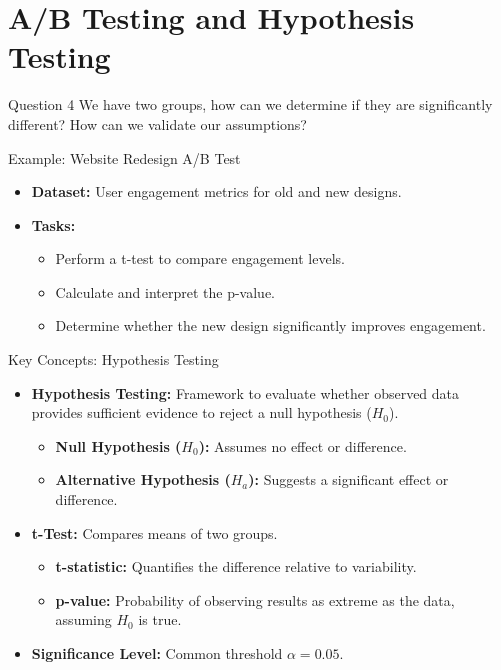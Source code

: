 \documentclass{beamer}
\begin{document}
\section{A/B Testing and Hypothesis Testing}

\begin{frame}{Question 4}
    We have two groups, how can we determine if they are significantly different? How can we validate our assumptions?
\end{frame}


\begin{frame}{Example: Website Redesign A/B Test}
    \begin{itemize}
        \item \textbf{Dataset:} User engagement metrics for old and new designs.
        \item \textbf{Tasks:}
        \begin{itemize}
            \item Perform a t-test to compare engagement levels.
            \item Calculate and interpret the p-value.
            \item Determine whether the new design significantly improves engagement.
        \end{itemize}
    \end{itemize}
    \end{frame}

\begin{frame}{Key Concepts: Hypothesis Testing}

\begin{itemize}
    \item \textbf{Hypothesis Testing:} Framework to evaluate whether observed data provides sufficient evidence to reject a null hypothesis ($H_0$).
    \begin{itemize}
        \item \textbf{Null Hypothesis ($H_0$):} Assumes no effect or difference.
        \item \textbf{Alternative Hypothesis ($H_a$):} Suggests a significant effect or difference.
    \end{itemize}
    \item \textbf{t-Test:} Compares means of two groups.
    \begin{itemize}
        \item \textbf{t-statistic:} Quantifies the difference relative to variability.
        \item \textbf{p-value:} Probability of observing results as extreme as the data, assuming $H_0$ is true.
    \end{itemize}
    \item \textbf{Significance Level:} Common threshold $\alpha = 0.05$.
\end{itemize}
\end{frame}
\end{document}
